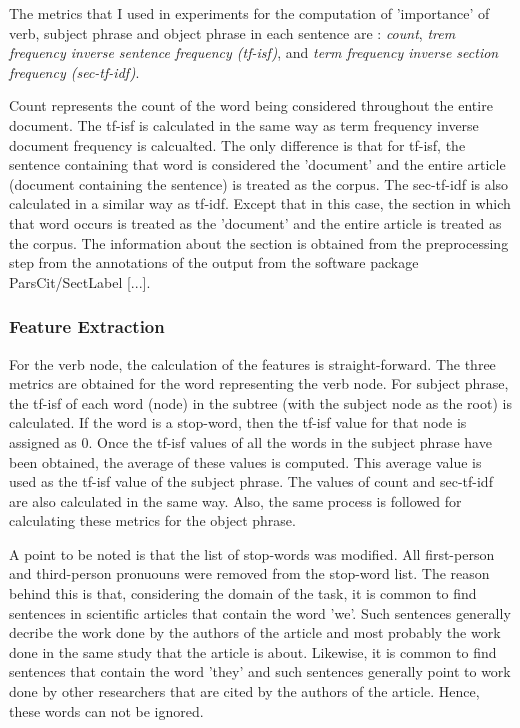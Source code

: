 The metrics that I used in experiments for the computation of 'importance' of verb, subject phrase and object phrase in each sentence are : \textit{count}, \textit{trem frequency inverse sentence frequency (tf-isf)}, and \textit{term frequency inverse section frequency (sec-tf-idf)}.

Count represents the count of the word being considered throughout the entire document.
The tf-isf is calculated in the same way as term frequency inverse document frequency is calcualted. The only difference is that for tf-isf, the sentence containing that word is considered the 'document' and the entire article (document containing the sentence) is treated as the corpus.
The sec-tf-idf is also calculated in a similar way as tf-idf.
Except that in this case, the section in which that word occurs is treated as the 'document' and the entire article is treated as the corpus.
The information about the section is obtained from the preprocessing step from the annotations of the output from the software package ParsCit/SectLabel [...].

\subsubsection*{Feature Extraction}
For the verb node, the calculation of the features is straight-forward.
The three metrics are obtained for the word representing the verb node.
For subject phrase, the tf-isf of each word (node) in the subtree (with the subject node as the root) is calculated.
If the word is a stop-word, then the tf-isf value for that node is assigned as 0.
Once the tf-isf values of all the words in the subject phrase have been obtained, the average of these values is computed.
This average value is used as the tf-isf value of the subject phrase.
The values of count and sec-tf-idf are also calculated in the same way.
Also, the same process is followed for calculating these metrics for the object phrase.


A point to be noted is that the list of stop-words was modified.
All first-person and third-person pronuouns were removed from the stop-word list.
The reason behind this is that, considering the domain of the task, it is common to find sentences in scientific articles that contain the word 'we'.
Such sentences generally decribe the work done by the authors of the article and most probably the work done in the same study that the article is about.
Likewise, it is common to find sentences that contain the word 'they' and such sentences generally point to work done by other researchers that are cited by the authors of the article.
Hence, these words can not be ignored.

